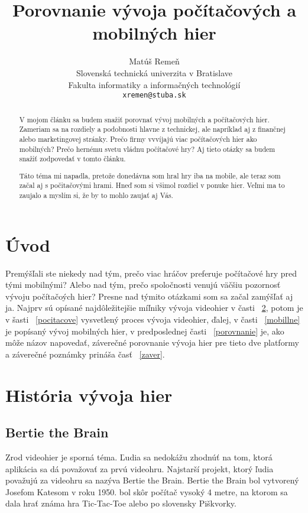 \documentclass[10pt,twoside,slovak,a4paper]{article}
\title{Porovnanie vývoja počítačových a mobilných hier}
\author{Matúš Remeň\\[2pt]
	{\small Slovenská technická univerzita v Bratislave}\\
	{\small Fakulta informatiky a informačných technológií}\\
	{\small \texttt{xremen@stuba.sk}}
	}
\date{\small              }
\begin{document}
\maketitle

\begin{abstract}
V mojom článku sa budem snažiť porovnať vývoj mobilných a počítačových hier. Zameriam sa na rozdiely a podobnosti hlavne z technickej, ale napríklad aj z finančnej alebo marketingovej stránky. Prečo firmy vvvíjajú viac počítačových hier ako mobilných? Prečo hernému svetu vládnu počítačové hry? Aj tieto otázky sa budem snažiť zodpovedať v tomto článku.

Táto téma mi napadla, pretože donedávna som hral hry iba na mobile, ale teraz som začal aj s počitačovými hrami. Hneď som si všimol rozdiel v ponuke hier. Veľmi ma to zaujalo  a myslím si, že by to mohlo zaujať aj Vás.
\end{abstract}



\section{Úvod}

Premýšľali ste niekedy nad tým, prečo viac hráčov preferuje počítačové hry pred tými mobilnými? Alebo nad tým, prečo spoločnosti venujú väčšiu pozornosť vývoju počítačoých hier? Presne nad týmito otázkami som sa začal zamýšľať aj ja. Najprv sú opísané najdôležitejšie míľniky vývoja videohier v časti ~\ref{historia}, potom je v šasti ~\ref{pocitacove} vysvetlený proces vývoja videohier, ďalej, v časti ~\ref{mobillne} je popísaný vývoj mobilných hier, v predposlednej časti ~\ref{porovnanie} je, ako môže názov napovedať, záverečné porovnanie vývoja hier pre tieto dve platformy a záverečné poznámky prináša časť ~\ref{zaver}.
\section{História vývoja hier} \label{historia} 

\subsection{Bertie the Brain} \label{historia:bertie}
Zrod videohier je sporná téma. Ľudia sa nedokážu zhodnúť na tom, ktorá aplikácia sa dá považovať za prvú videohru. Najstarší projekt, ktorý ľudia považujú za videohru sa nazýva Bertie the Brain. Bertie the Brain bol vytvorený Josefom Katesom v roku 1950. bol skôr počítač vysoký 4 metre, na ktorom sa dala hrať známa hra Tic-Tac-Toe alebo po slovensky Piškvorky.
\end{document}
